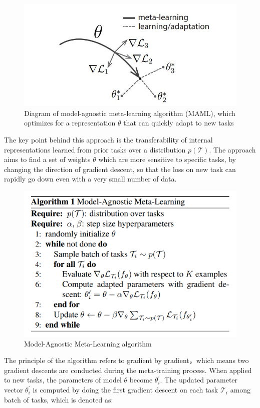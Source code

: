 \begin{figure}[H]
	\includegraphics[scale=0.6]{MAML_01.JPG}
	\centering
	\caption{Diagram of model-agnostic meta-learning algorithm (MAML), which optimizes for a representation $\theta$ that can
    quickly adapt to new tasks}
	\label{MAML}
\end{figure}

The key point behind this approach is the transferability of internal representations learned from prior tasks over a distribution $p(\mathcal{T})$. The approach aims to find a set of weights $\theta$ which are more sensitive to specific tasks, by changing the direction of gradient descent, so that the loss on new task can rapidly go down even with a very small number of data.  

\begin{figure}[H]
	\includegraphics[scale=0.65]{MAML_02.PNG}
	\centering
	\caption{Model-Agnostic Meta-Learning algorithm}
	\label{MAML}
\end{figure}

The principle of the algorithm refers to gradient by gradient，which means two gradient descents are conducted during the meta-training process. When applied to new tasks, the parameters of model $\theta$ become $\theta_{i}^{\prime}$. The updated parameter vector $\theta_{i}^{\prime}$ is computed by doing the first gradient descent on each task $\mathcal{T}_{i}$ among batch of tasks, which is denoted as:


